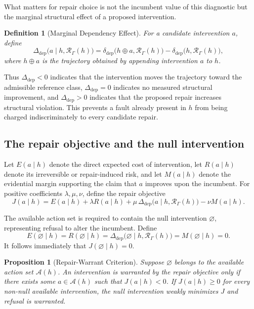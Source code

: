 \documentclass[11pt]{article}
\newtheorem{definition}{Definition}[section]
\newtheorem{proposition}{Proposition}[section]
\begin{document}
What matters for repair choice is not the incumbent value of this
diagnostic but the marginal structural effect of a proposed intervention.

\begin{definition}[Marginal Dependency Effect]
	For a candidate intervention $a$, define
	\[
		\Delta_{\mathrm{dep}}\bigl(a \mid h, \mathcal{R}_\Gamma(h)\bigr)
		=
		\delta_{\mathrm{dep}}\bigl(h \oplus a, \mathcal{R}_\Gamma(h)\bigr)
		-
		\delta_{\mathrm{dep}}\bigl(h, \mathcal{R}_\Gamma(h)\bigr),
	\]
	where $h \oplus a$ is the trajectory obtained by appending intervention
	$a$ to $h$.
\end{definition}

Thus $\Delta_{\mathrm{dep}} < 0$ indicates that the intervention moves the
trajectory toward the admissible reference class, $\Delta_{\mathrm{dep}}
= 0$ indicates no measured structural improvement, and
$\Delta_{\mathrm{dep}} > 0$ indicates that the proposed repair increases
structural violation. This prevents a fault already present in $h$ from
being charged indiscriminately to every candidate repair.

\subsection{The repair objective and the null intervention}

Let $E(a \mid h)$ denote the direct expected cost of intervention, let
$R(a \mid h)$ denote its irreversible or repair-induced risk, and let
$M(a \mid h)$ denote the evidential margin supporting the claim that $a$
improves upon the incumbent. For positive coefficients
$\lambda, \mu, \nu$, define the repair objective
\[
	J(a \mid h)
	=
	E(a \mid h)
	+ \lambda R(a \mid h)
	+ \mu \, \Delta_{\mathrm{dep}}\bigl(a \mid h, \mathcal{R}_\Gamma(h)\bigr)
	- \nu M(a \mid h).
\]

The available action set is required to contain the null intervention
$\varnothing$, representing refusal to alter the incumbent. Define
\[
	E(\varnothing \mid h) = R(\varnothing \mid h)
	= \Delta_{\mathrm{dep}}\bigl(\varnothing \mid h, \mathcal{R}_\Gamma(h)\bigr)
	= M(\varnothing \mid h) = 0.
\]
It follows immediately that $J(\varnothing \mid h) = 0$.

\begin{proposition}[Repair-Warrant Criterion]
	Suppose $\varnothing$ belongs to the available action set
	$\mathcal{A}(h)$. An intervention is warranted by the repair objective
	only if there exists some $a \in \mathcal{A}(h)$ such that
	$J(a \mid h) < 0$. If $J(a \mid h) \geq 0$ for every non-null available
	intervention, the null intervention weakly minimizes $J$ and refusal is
	warranted.
\end{proposition}
\end{document}
